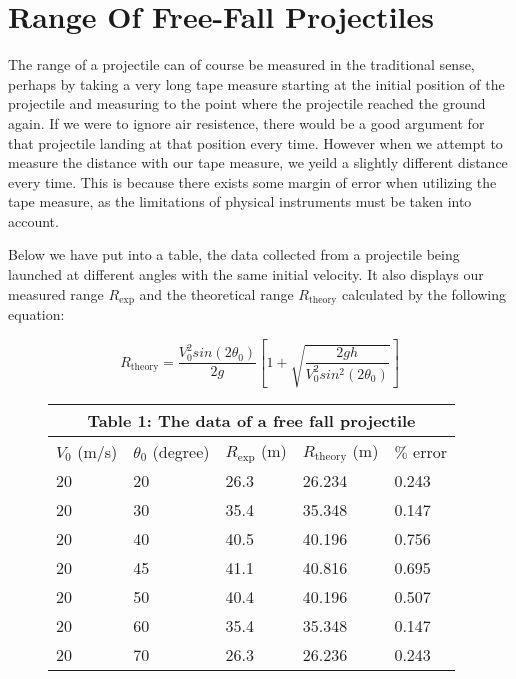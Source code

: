 \documentclass[12pt]{article}
\begin{document}
\section{Range Of Free-Fall Projectiles}
The range of a projectile can of course be measured in the traditional sense, perhaps by taking a very long tape measure starting at the initial position of the projectile and measuring to the point where the projectile reached the ground again. If we were to ignore air resistence, there would be a good argument for that projectile landing at that position every time. However when we attempt to measure the distance with our tape measure, we yeild a slightly different distance every time. This is because there exists some margin of error when utilizing the tape measure, as the limitations of physical instruments must be taken into account.

Below we have put into a table, the data collected from a projectile being launched at different angles with the same initial velocity. It also displays our measured range $R_\text{exp}$ and the theoretical range $R_\text{theory}$ calculated by the following equation:

\[R_\text{theory} = \frac{V_0^2sin(2 \theta_0)}{2g} \left[1+\sqrt{\frac{2gh}{V_0^2sin^2(2 \theta_0)}} \right]\]

\setlength{\tabcolsep}{5pt}
\renewcommand{\arraystretch}{1.4}

\begin{figure}[H]
    \centering
    \begin{tabular}{ p{2cm}p{2cm}p{2cm}p{2cm}p{2cm} }
        \hline
        \multicolumn{5}{c}{Table 1: The data of a free fall projectile} \\
        \hline
        $V_0$ (m/s) & $\theta_0$ (degree) & $R_\text{exp}$ (m) & $R_\text{theory}$ (m) & $\%$ error \\
        \hline
        20 & 20 & 26.3 & 26.234 & 0.243 \\
        20 & 30 & 35.4 & 35.348 & 0.147 \\
        20 & 40 & 40.5 & 40.196 & 0.756 \\
        20 & 45 & 41.1 & 40.816 & 0.695 \\
        20 & 50 & 40.4 & 40.196 & 0.507 \\
        20 & 60 & 35.4 & 35.348 & 0.147 \\
        20 & 70 & 26.3 & 26.236 & 0.243 \\
        \hline
    \end{tabular}
\end{figure}
\end{document}
